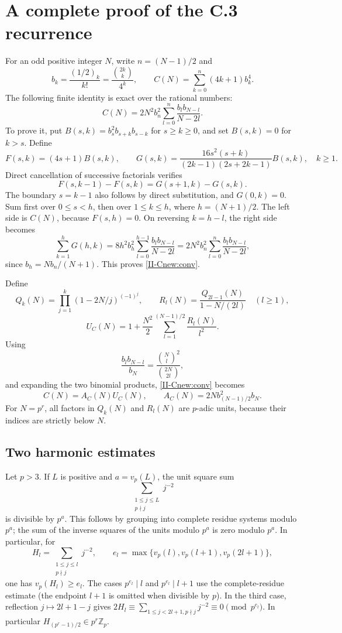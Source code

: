 \documentclass[11pt,letterpaper]{article}
\numberwithin{equation}{section}
\begin{document}
\section{A complete proof of the C.3 recurrence}\label{loc-II-4}\label{II-sec:C-complete}
For an odd positive integer $N$, write $n=(N-1)/2$ and
\[
 b_k=\frac{(1/2)_k}{k!}=\frac{\binom{2k}{k}}{4^k},\qquad
 C(N)=\sum_{k=0}^{n}(4k+1)b_k^4.
\]
The following finite identity is exact over the rational numbers:
\begin{equation}\label{II-Cnew:conv}
 C(N)=2N^2b_n^2\sum_{l=0}^{n}\frac{b_l b_{N-l}}{N-2l}.
\end{equation}
To prove it, put $B(s,k)=b_s^2b_{s+k}b_{s-k}$ for $s\ge k\ge0$,
and set $B(s,k)=0$ for $k>s$. Define
\[
 F(s,k)=(4s+1)B(s,k),\qquad
 G(s,k)=\frac{16s^2(s+k)}{(2k-1)(2s+2k-1)}B(s,k),\quad k\ge1.
\]
Direct cancellation of successive factorials verifies
\[
 F(s,k-1)-F(s,k)=G(s+1,k)-G(s,k).
\]
The boundary $s=k-1$ also follows by direct substitution, and $G(0,k)=0$.
Sum first over $0\le s<h$, then over $1\le k\le h$, where
$h=(N+1)/2$. The left side is $C(N)$, because $F(s,h)=0$.
On reversing $k=h-l$, the right side becomes
\[
 \sum_{k=1}^hG(h,k)
 =8h^2b_h^2\sum_{l=0}^{h-1}\frac{b_l b_{N-l}}{N-2l}
 =2N^2b_n^2\sum_{l=0}^{n}\frac{b_l b_{N-l}}{N-2l},
\]
since $b_h=N b_n/(N+1)$. This proves \eqref{II-Cnew:conv}.

Define
\[
 Q_k(N)=\prod_{j=1}^{k}(1-2N/j)^{(-1)^j},\qquad
 R_l(N)=\frac{Q_{2l-1}(N)}{1-N/(2l)}\quad(l\ge1),
\]
\begin{equation}\label{II-Cnew:U}
 U_C(N)=1+\frac{N^2}{2}\sum_{l=1}^{(N-1)/2}\frac{R_l(N)}{l^2}.
\end{equation}
Using
\[
 \frac{b_l b_{N-l}}{b_N}=
 \frac{\binom Nl^2}{\binom{2N}{2l}},
\]
and expanding the two binomial products, \eqref{II-Cnew:conv} becomes
\begin{equation}\label{II-Cnew:factor}
 C(N)=A_C(N)U_C(N),\qquad A_C(N)=2N b_{(N-1)/2}^{2}b_N.
\end{equation}
For $N=p^r$, all factors in $Q_k(N)$ and $R_l(N)$ are $p$-adic units,
because their indices are strictly below $N$.

\subsection{Two harmonic estimates}
Let $p>3$. If $L$ is positive and $a=v_p(L)$, the unit square sum
\[
 \sum_{\substack{1\le j\le L\\p\nmid j}}j^{-2}
\]
is divisible by $p^a$. This follows by grouping into complete residue
systems modulo $p^a$; the sum of the inverse squares of the units modulo
$p^a$ is zero modulo $p^a$. In particular, for
\[
 H_l=\sum_{\substack{1\le j\le l\\p\nmid j}}j^{-2},
 \qquad e_l=\max\{v_p(l),v_p(l+1),v_p(2l+1)\},
\]
one has $v_p(H_l)\ge e_l$. The cases $p^{e_l}\mid l$ and
$p^{e_l}\mid l+1$ use the complete-residue estimate (the endpoint
$l+1$ is omitted when divisible by $p$). In the third case, reflection
$j\mapsto2l+1-j$ gives
$2H_l\equiv\sum_{1\le j<2l+1,p\nmid j}j^{-2}\equiv0\pmod{p^{e_l}}$.
In particular $H_{(p^r-1)/2}\in p^r\mathbb Z_p$.
\end{document}
